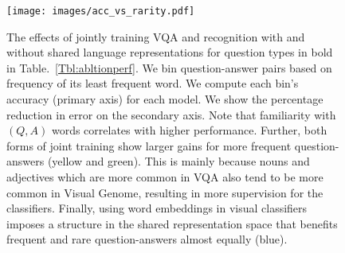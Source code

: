 \begin{figure}[t]
\begin{center}
\texttt{[image: images/acc\_vs\_rarity.pdf]}
\vspace{-1cm}
\end{center}
  \caption{The effects of jointly training VQA and recognition with and without shared language representations for question types in bold in Table.~\ref{Tbl:abltionperf}. We bin question-answer pairs based on frequency of its least frequent word. We compute each bin's accuracy (primary axis) for each model. We show the percentage reduction in error on the secondary axis. Note that familiarity with $(Q,A)$ words correlates with higher performance. Further, both forms of joint training show larger gains for more frequent question-answers (yellow and green). This is mainly because nouns and adjectives which are more common in VQA also tend to be more common in Visual Genome, resulting in more supervision for the classifiers. Finally, using word embeddings in visual classifiers imposes a structure in the shared representation space that benefits frequent and rare question-answers almost equally (blue).}
\label{fig:acc_vs_rarity}
\end{figure}